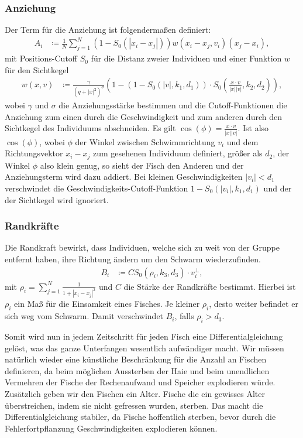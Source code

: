 \documentclass[a4paper,11pt]{article}
\theoremstyle{definition}
\numberwithin{equation}{section}
\begin{document}
	\subsubsection{Anziehung}
	Der Term für die Anziehung ist folgendermaßen definiert:
	\begin{align*}
		A_i &\coloneqq \frac{1}{N}\sum^N_{j = 1} (1-S_0(|x_i - x_j|))w(x_i - x_j, v_i)(x_j - x_i), 
	\end{align*}
	mit Positions-Cutoff $S_0$ für die Distanz zweier Individuen und einer Funktion $w$ für den Sichtkegel
	\begin{align*}
		w(x,v) &\coloneqq \frac{\gamma}{(q+|x|^2)^{\sigma}}\left(1-(1-S_0(|v|, k_1, d_1))\cdot S_0(\frac{x\cdot v}{|x||v|}, k_2, d_2)\right),
	\end{align*}
	wobei $\gamma$ und $\sigma$ die Anziehungsstärke bestimmen und die Cutoff-Funktionen die Anziehung zum einen durch die Geschwindigkeit und zum anderen durch den Sichtkegel des Individuums abschneiden.
	Es gilt $\cos(\phi) = \frac{x\cdot v}{|x||v|}$. Ist also $\cos(\phi)$, wobei $\phi$ der Winkel zwischen Schwimmrichtung $v_i$ und dem Richtungsvektor $x_i - x_j$ zum gesehenen Individuum definiert, größer als $d_2$, der Winkel $\phi$ also klein genug, so sieht der Fisch den Anderen und der Anziehungsterm wird dazu addiert. Bei kleinen Geschwindigkeiten $|v_i| < d_1$ verschwindet die Geschwindigkeits-Cutoff-Funktion $1-S_0(|v_i|, k_1, d_1)$ und der der Sichtkegel wird ignoriert.
	
	\subsubsection{Randkräfte}
	Die Randkraft bewirkt, dass Individuen, welche sich zu weit von der Gruppe entfernt haben, ihre Richtung ändern um den Schwarm wiederzufinden.
	\begin{align*}
		B_i &\coloneqq CS_0(\rho_i, k_3, d_3)\cdot v_i^\perp, 
	\end{align*}
	mit $\rho_i = \sum^N_{j = 1} \frac{1}{1+|x_i-x_j|^2}$ und $C$ die Stärke der Randkräfte bestimmt.
	Hierbei ist $\rho_i$ ein Maß für die Einsamkeit eines Fisches. Je kleiner $\rho_i$, desto weiter befindet er sich weg vom Schwarm.
	Damit verschwindet $B_i$, falls $\rho_i > d_3$.\newline
	
	Somit wird nun in jedem Zeitschritt für jeden Fisch eine Differentialgleichung gelöst, was das ganze Unterfangen wesentlich aufwändiger macht. Wir müssen natürlich wieder eine künstliche Beschränkung für die Anzahl an Fischen definieren, da beim möglichen Aussterben der Haie und beim unendlichen Vermehren der Fische der Rechenaufwand und Speicher explodieren würde. Zusätzlich geben wir den Fischen ein Alter. Fische die ein gewisses Alter überstreichen, indem sie nicht gefressen wurden, sterben. Das macht die Differentialgleichung stabiler, da Fische hoffentlich sterben, bevor durch die Fehlerfortpflanzung Geschwindigkeiten explodieren können.\newline
	
\end{document}
